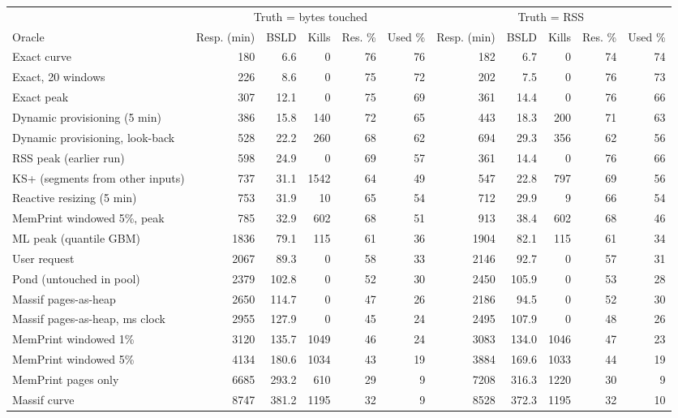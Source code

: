 \begin{tabular}{lrrrrrrrrrr}
\toprule
 & \multicolumn{5}{c}{Truth = bytes touched} & \multicolumn{5}{c}{Truth = RSS} \\
\cmidrule(lr){2-6} \cmidrule(lr){7-11}
Oracle & Resp. (min) & BSLD & Kills & Res. \% & Used \% & Resp. (min) & BSLD & Kills & Res. \% & Used \% \\
\midrule
Exact curve & 180 & 6.6 & 0 & 76 & 76 & 182 & 6.7 & 0 & 74 & 74 \\
Exact, 20 windows & 226 & 8.6 & 0 & 75 & 72 & 202 & 7.5 & 0 & 76 & 73 \\
Exact peak & 307 & 12.1 & 0 & 75 & 69 & 361 & 14.4 & 0 & 76 & 66 \\
Dynamic provisioning (5 min) & 386 & 15.8 & 140 & 72 & 65 & 443 & 18.3 & 200 & 71 & 63 \\
Dynamic provisioning, look-back & 528 & 22.2 & 260 & 68 & 62 & 694 & 29.3 & 356 & 62 & 56 \\
RSS peak (earlier run) & 598 & 24.9 & 0 & 69 & 57 & 361 & 14.4 & 0 & 76 & 66 \\
KS+ (segments from other inputs) & 737 & 31.1 & 1542 & 64 & 49 & 547 & 22.8 & 797 & 69 & 56 \\
Reactive resizing (5 min) & 753 & 31.9 & 10 & 65 & 54 & 712 & 29.9 & 9 & 66 & 54 \\
MemPrint windowed 5\%, peak & 785 & 32.9 & 602 & 68 & 51 & 913 & 38.4 & 602 & 68 & 46 \\
ML peak (quantile GBM) & 1836 & 79.1 & 115 & 61 & 36 & 1904 & 82.1 & 115 & 61 & 34 \\
User request & 2067 & 89.3 & 0 & 58 & 33 & 2146 & 92.7 & 0 & 57 & 31 \\
Pond (untouched in pool) & 2379 & 102.8 & 0 & 52 & 30 & 2450 & 105.9 & 0 & 53 & 28 \\
Massif pages-as-heap & 2650 & 114.7 & 0 & 47 & 26 & 2186 & 94.5 & 0 & 52 & 30 \\
Massif pages-as-heap, ms clock & 2955 & 127.9 & 0 & 45 & 24 & 2495 & 107.9 & 0 & 48 & 26 \\
MemPrint windowed 1\% & 3120 & 135.7 & 1049 & 46 & 24 & 3083 & 134.0 & 1046 & 47 & 23 \\
MemPrint windowed 5\% & 4134 & 180.6 & 1034 & 43 & 19 & 3884 & 169.6 & 1033 & 44 & 19 \\
MemPrint pages only & 6685 & 293.2 & 610 & 29 & 9 & 7208 & 316.3 & 1220 & 30 & 9 \\
Massif curve & 8747 & 381.2 & 1195 & 32 & 9 & 8528 & 372.3 & 1195 & 32 & 10 \\

\end{tabular}
